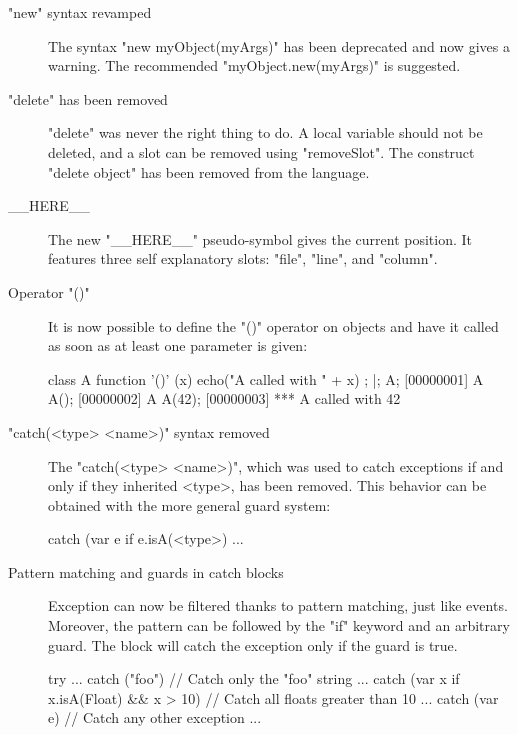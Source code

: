 \begin{description}
\item["new" syntax revamped]
The syntax "new myObject(myArgs)" has been deprecated and now gives a
warning. The recommended "myObject.new(myArgs)" is suggested.

\item["delete" has been removed]

"delete" was never the right thing to do. A local variable should
not be deleted, and a slot can be removed using "removeSlot".
The construct "delete object" has been removed from the
language.

\item[\_\_HERE\_\_]

The new "\_\_HERE\_\_" pseudo-symbol gives the current position.  It
features three self explanatory slots: "file", "line", and "column".

\item[Operator "()"]

It is now possible to define the "()" operator on objects and have
it called as soon as at least one parameter is given:

\begin{urbiscript}
class A {
  function '()' (x) { echo("A called with " + x) };
}|;
A;
[00000001] A
A();
[00000002] A
A(42);
[00000003] *** A called with 42
\end{urbiscript}

\item["catch(<type> <name>)" syntax removed]

The "catch(<type> <name>)", which was used to catch exceptions if and
only if they inherited <type>, has been removed. This behavior can be
obtained with the more general guard system:

\begin{urbiunchecked}
catch (var e if e.isA(<type>)
{
  ...
}
\end{urbiunchecked}

\item[Pattern matching and guards in catch blocks]

Exception can now be filtered thanks to pattern matching, just like
events. Moreover, the pattern can be followed by the "if" keyword and
an arbitrary guard. The block will catch the exception only if the
guard is true.

\begin{urbiunchecked}
try
{ ... }
catch ("foo") // Catch only the "foo" string
{ ... }
catch (var x if x.isA(Float) && x > 10) // Catch all floats greater than 10
{ ... }
catch (var e)  // Catch any other exception
{ ... }
\end{urbiunchecked}


\end{description}
